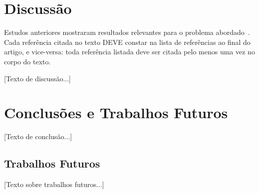 \documentclass[sigconf, nonacm, screen, language=portuguese, language=spanish, language={main=english}]{acmart}             %
\begin{document}
\section{Discussão}\label{sec:discussao}
Estudos anteriores mostraram resultados relevantes para o problema
abordado~\cite{kalman1960, haykin2014}. Cada referência citada no
texto DEVE constar na lista de referências ao final do artigo, e
vice-versa: toda referência listada deve ser citada pelo menos uma
vez no corpo do texto.

[Texto de discussão...]


\section{Conclusões e Trabalhos Futuros}\label{sec:conclusao}
[Texto de conclusão...]

\subsection{Trabalhos Futuros}\label{sec:trabalhos_futuros}
[Texto sobre trabalhos futuros...]


\end{document}
